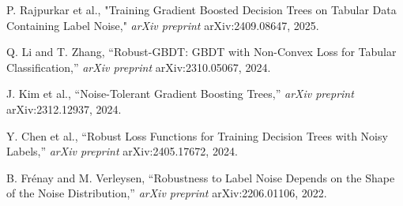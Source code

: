 \documentclass[conference]{IEEEtran}
\begin{document}
\begin{thebibliography}{1}

P. Rajpurkar et al., "Training Gradient Boosted Decision Trees on Tabular Data Containing Label Noise," \textit{arXiv preprint} arXiv:2409.08647, 2025.

Q. Li and T. Zhang, “Robust-GBDT: GBDT with Non-Convex Loss for Tabular Classification,” \textit{arXiv preprint} arXiv:2310.05067, 2024.

J. Kim et al., “Noise-Tolerant Gradient Boosting Trees,” \textit{arXiv preprint} arXiv:2312.12937, 2024.

Y. Chen et al., “Robust Loss Functions for Training Decision Trees with Noisy Labels,” \textit{arXiv preprint} arXiv:2405.17672, 2024.

B. Frénay and M. Verleysen, “Robustness to Label Noise Depends on the Shape of the Noise Distribution,” \textit{arXiv preprint} arXiv:2206.01106, 2022.

\end{thebibliography}
\end{document}
